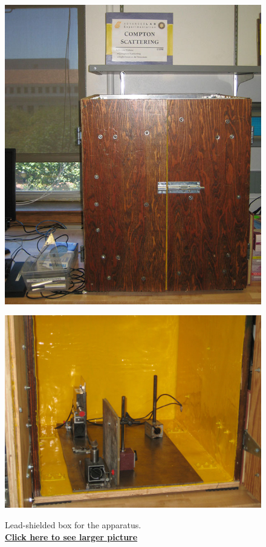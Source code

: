 \documentclass{../lab}
\begin{document}
\begin{figure}[!h]
\begin{minipage}{.49\linewidth}
    \centering
    \href{http://experimentationlab.berkeley.edu/sites/default/files/images/COM_3526-Lg.JPG}{\includegraphics[width=\linewidth,keepaspectratio]{images/COM_3526-Lg.JPG}} \\
    \caption{Lead-shielded box for the apparatus. \\ \href{http://experimentationlab.berkeley.edu/sites/default/files/images/COM_3526-Lg.JPG}{\textbf{Click here to see larger picture}}}
\end{minipage}\hfill
\begin{minipage}{.49\linewidth}
    \centering
    \href{http://experimentationlab.berkeley.edu/sites/default/files/images/COM_Inside_3525-Lg.JPG}{\includegraphics[width=\linewidth,keepaspectratio]{images/COM_Inside_3525-Lg.JPG}} \\

\end{minipage}
\end{figure}
\end{document}
